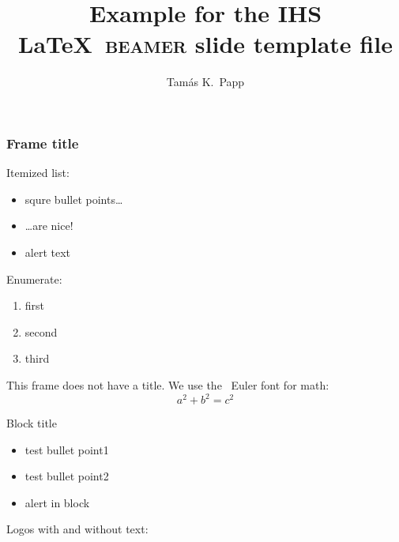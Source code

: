 \documentclass{beamer}
\begin{document}
\title[Short title]{Example for the IHS \LaTeX\ \textsc{beamer} slide template file}
\author[Tam\'as]{Tam\'as K.~Papp}

\begin{frame}[plain]
  \titlepage
\end{frame}

\begin{frame}
  \frametitle{Frame title}

  Itemized list:

  \begin{itemize}
  \item squre bullet points\dots
  \item \dots are nice!
  \item \alert{alert text}
  \end{itemize}

  \bigskip
  
  Enumerate:

  \begin{enumerate}
  \item first
  \item second
  \item third
  \end{enumerate}

\end{frame}

\begin{frame}
  This frame does not have a title.  We use the \AmS\ Euler font for math:
  \begin{equation*}
    a^2+b^2=c^2
  \end{equation*}

  \begin{block}{Block title}
    \begin{itemize}
    \item test bullet point1
    \item test bullet point2
    \item \alert{alert in block}
    \end{itemize}
  \end{block}

  \bigskip

  Logos with and without text:
  \begin{center}
    \IHSlogotext[height=2em] \hspace{2em} \IHSlogo[height=2em]
  \end{center}
\end{frame}
\end{document}

